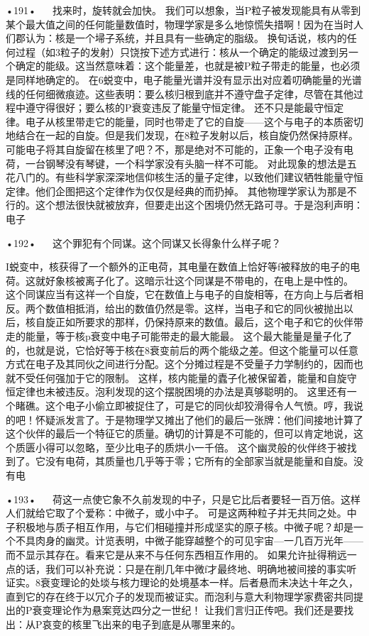 {•191•
  
找来时，旋转就会加快。
我们可以想象，当P粒子被发现能具有从零到某个最大值之间的任何能量数值时，物理学家是多么地惊慌失措啊！因为在当时人们郡认为：核是一个埽子系统，并且具有一些确定的脂级。
换旬话说，核内的任何过程（如3粒子的发射）只饶按下述方式进行：核从一个确定的能级过渡到另一个确定的能级。这当然意味着：这个能量差，也就是被P粒子带走的能量，也必须是同样地确定的。
在6蜕变中，电子能量光谱并没有显示出对应着叨确能量的光谱线的任何细微痕迹。这些表明：要么核归根到底并不遵守盘子定律，尽管在其他过程中遵守得很好；要么核的P衰变违反了能量守恒定律。
还不只是能最守恒定律。电子从核里带走它的能量，同时也带走了它的自旋——这个与电子的本质密切地结合在一起的自旋。但是我们发现，在8粒子发射以后，核自旋仍然保持原样。可能电子将其自旋留在核里了吧？不，那是绝对不可能的，正象一个电子没有电荷，一台钢琴没有琴键，一个科学家没有头脑一样不可能。
对此现象的想法是五花八门的。有些科学家深深地信仰核生活的量子定律，以致他们建议牺牲能量守恒定律。他们企图把这个定律作为仅仅是经典的而扔掉。
其他物理学家认为那是不行的。这个想法很快就被放弃，但要走出这个困境仍然无路可寻。于是泡利声明：电子

•192•
  
这个罪犯有个同谋。这个同谋又长得象什么样子呢？
{I蜕变中，核获得了一个额外的正电荷，其电量在数值上恰好等f被释放的电子的电荷。这就好象核被离子化了。这暗示壮这个同谋是不带电的，在电上是中性的。
这个同谋应当有这祥一个自旋，它在数值上与电子的自旋相等，在方向上与后者相反。两个数值相抵消，给出的数值仍然是零。这样，当电子和它的同伙被抛出以后，核自旋正如所要求的那样，仍保持原来的数值。最后，这个电子和它的伙伴带走的能量，等于核p衰变中电子可能带走的最大能最。
这个最大能量是量子化了的，也就是说，它恰好等于核在8衰变前后的两个能级之差。但这个能量可以任意方式在电子及其同伙之间进行分配。这个分摊过程是不受量子力学制约的，因而也就不受任何强加于它的限制。
这样，核内能量的蠹子化被保留着，能量和自旋守恒定律也未被违反。泡利发现的这个摆脱困境的办法是真够聪明的。
这里还有一个睹礁。这个电子小偷立即被捉住了，可是它的同伙却狡滑得令人气愤。哼，我说的吧！怀疑派发言了。于是物理学又摊出了他们的最后一张牌：他们间接地计算了这个伙伴的最后一个特征它的质量。确切的计算是不可能的，但可以肯定地说，这个质匮小得可以忽略，至少比电子的质烘小一千倍。
这个幽灵般的伙伴终于被找到了。它没有电荷，其质量也几乎等于零；它所有的全部家当就是能量和自旋。没有电

•193•
  
荷这一点使它象不久前发现的中子，只是它比后者要轻一百万倍。这样人们就给它取了个爱称：中微子，或小中子。
可是这两种粒子并无共同之处。中子积极地与质子相互作用，与它们相碰撞并形成坚实的原子核。中微子呢？却是一个不具肉身的幽灵。计览表明，中微子能穿越整个的可见宇宙—一几百万光年——而不显示其存在。看来它是从来不与任何东西相互作用的。
如果允许扯得稍远一点的话，我们可以补充说：只是在削几年中微f才最终地、明确地被间接的事实听证实。8衰变理论的处埮与核力理论的处境基本一样。后者悬而未决达十年之久，直到它的存在终于以冗介子的发现而被证实。而泡利与意大利物理学家费密共同提出的P衰变理论作为悬案竞达四分之一世纪！
让我们言归正传吧。我们还是要找出：从P哀变的核里飞出来的电子到底是从哪里来的。

}}
